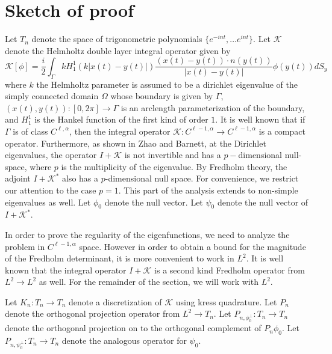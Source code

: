 \section{Sketch of proof}
\label{sec:appb}
Let $T_{n}$ denote the space of trigonometric polynomials
$\{ e^{-int}, \ldots e^{int} \}$. 
Let $\mathcal{K}$ denote the Helmholtz double layer integral operator
given by
\begin{equation}
\mathcal{K}[\phi] = \frac{i}{2}\int_{\Gamma} k H_{1}^{1}(k|x(t)-y(t)|) \frac{(x(t)-y(t))\cdot n(y(t))}{|x(t)-y(t)|} \phi(y(t)) dS_{y} \,
\end{equation}
where $k$ the Helmholtz parameter is assumed to be a dirichlet eigenvalue of the simply connected
domain $\Omega$ whose boundary is given by $\Gamma$, $(x(t),y(t)): [0,2\pi] \to \Gamma$ is
an arclength parameterization of the boundary, and $H_{1}^{1}$ is the Hankel function
of the first kind of order $1$.
It is well known that if $\Gamma$ is of class $C^{\ell,\alpha}$, then the
integral operator $\mathcal{K}: C^{\ell-1,\alpha} \to C^{\ell-1,\alpha}$ is a compact operator.
Furthermore, as shown in Zhao and Barnett, at the Dirichlet eigenvalues, the operator
$I + \mathcal{K}$ is not invertible and has a $p-$dimensional null-space, where
$p$ is the multiplicity of the eigenvalue. 
By Fredholm theory, the adjoint $I + \mathcal{K}^{\ast}$ also has a $p$-dimensional null space.
For convenience, we restrict our attention to the case $p=1$. This
part of the analysis extends to non-simple eigenvalues as well. 
Let $\phi_{0}$ denote
the null vector. 
Let $\psi_{0}$ denote the null vector of $I+\mathcal{K}^{\ast}$.

In order to prove the regularity of the eigenfunctions, we need to analyze
the problem in $C^{\ell-1,\alpha}$ space. 
However in order to obtain a bound for the magnitude of the Fredholm
determinant, it is more convenient to work in $L^{2}$. It is well known
that the integral operator $I + \mathcal{K}$ is a second kind
Fredholm operator from $L^{2} \to L^{2}$ as well.
For the remainder of the section, we will work with $L^{2}$.


Let $K_{n}: T_{n} \to T_{n}$ 
denote a discretization of $\mathcal{K}$ 
using kress quadrature. 
Let $P_{n}$ denote the orthogonal 
projection operator from $L^{2} \to T_{n}$.
Let $P_{n,\phi_{0}^{\perp}}: T_{n} \to T_{n}$ denote the orthogonal
projection on to the orthogonal complement of $P_{n} \phi_{0}$.
Let $P_{n,\psi_{0}^{\perp}}: T_{n} \to T_{n}$ denote the
analogous operator for $\psi_{0}$. 

